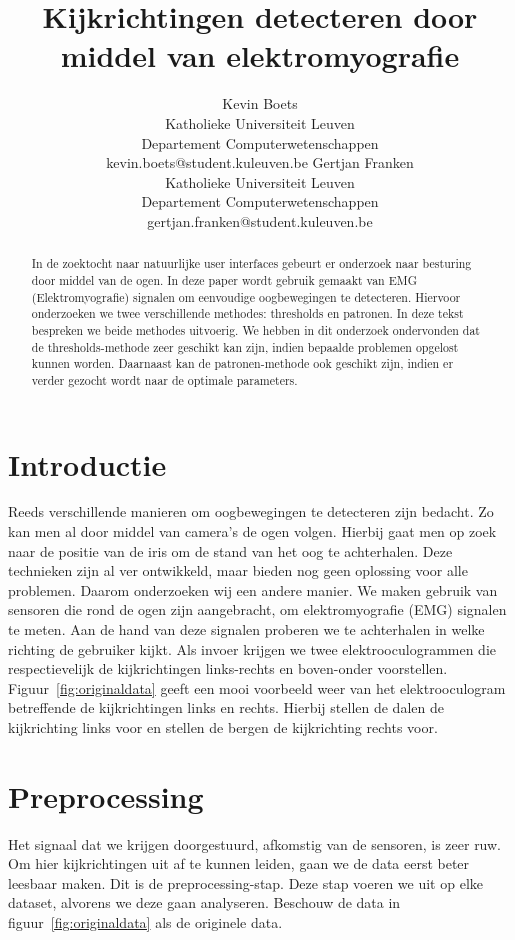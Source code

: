 \documentclass{article}
\title{Kijkrichtingen detecteren door middel van elektromyografie}
\author{Kevin Boets \\ Katholieke Universiteit Leuven\\ Departement Computerwetenschappen \\ kevin.boets@student.kuleuven.be
\And
Gertjan Franken \\ Katholieke Universiteit Leuven\\ Departement Computerwetenschappen \\ gertjan.franken@student.kuleuven.be}
\begin{document}
\maketitle

\begin{abstract}
In de zoektocht naar natuurlijke user interfaces gebeurt er onderzoek naar besturing door middel van de ogen. In deze paper wordt gebruik gemaakt van EMG (Elektromyografie) signalen om eenvoudige oogbewegingen te detecteren. Hiervoor onderzoeken we twee verschillende methodes: thresholds en patronen. In deze tekst bespreken we beide methodes uitvoerig. We hebben in dit onderzoek ondervonden dat de thresholds-methode zeer geschikt kan zijn, indien bepaalde problemen opgelost kunnen worden. Daarnaast kan de patronen-methode ook geschikt zijn, indien er verder gezocht wordt naar de optimale parameters.
\end{abstract}

\section{Introductie}

Reeds verschillende manieren om oogbewegingen te detecteren zijn bedacht. Zo kan men al door middel van camera's de ogen volgen. Hierbij gaat men op zoek naar de positie van de iris om de stand van het oog te achterhalen. Deze technieken zijn al ver ontwikkeld, maar bieden nog geen oplossing voor alle problemen. Daarom onderzoeken wij een andere manier. We maken gebruik van sensoren die rond de ogen zijn aangebracht, om elektromyografie (EMG) signalen te meten. Aan de hand van deze signalen proberen we te achterhalen in welke richting de gebruiker kijkt. Als invoer krijgen we twee elektrooculogrammen die respectievelijk de kijkrichtingen links-rechts en boven-onder voorstellen. Figuur~\ref{fig:originaldata} geeft een mooi voorbeeld weer van het elektrooculogram betreffende de kijkrichtingen links en rechts. Hierbij stellen de dalen de kijkrichting links voor en stellen de bergen de kijkrichting rechts voor.

\section{Preprocessing}

Het signaal dat we krijgen doorgestuurd, afkomstig van de sensoren, is zeer ruw. Om hier kijkrichtingen uit af te kunnen leiden, gaan we de data eerst beter leesbaar maken. Dit is de preprocessing-stap. Deze stap voeren we uit op elke dataset,  alvorens we deze gaan analyseren. Beschouw de data in figuur~\ref{fig:originaldata} als de originele data.
\end{document}
